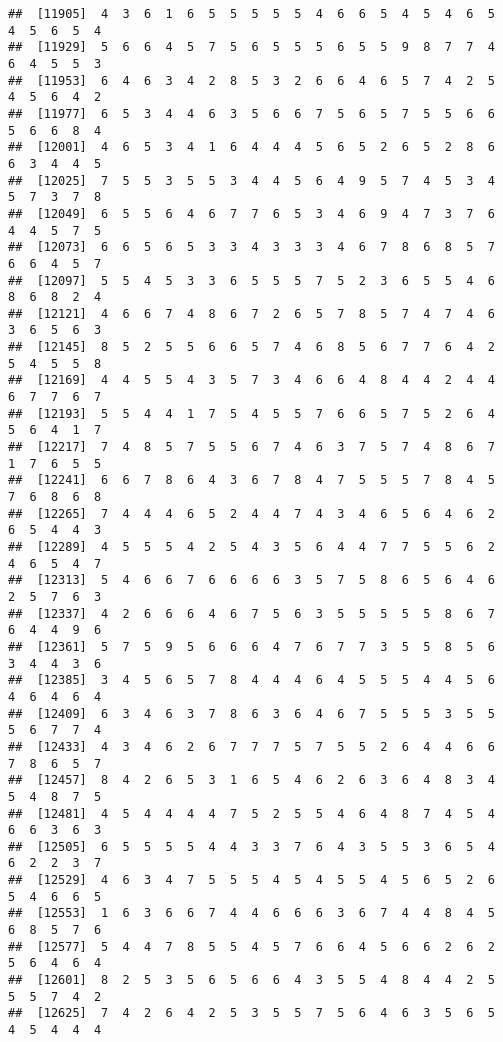 \documentclass[
]{book}
\begin{document}
\begin{verbatim}
##  [11905]  4  3  6  1  6  5  5  5  5  5  4  6  6  5  4  5  4  6  5  4  5  6  5  4
##  [11929]  5  6  6  4  5  7  5  6  5  5  5  6  5  5  9  8  7  7  4  6  4  5  5  3
##  [11953]  6  4  6  3  4  2  8  5  3  2  6  6  4  6  5  7  4  2  5  4  5  6  4  2
##  [11977]  6  5  3  4  4  6  3  5  6  6  7  5  6  5  7  5  5  6  6  5  6  6  8  4
##  [12001]  4  6  5  3  4  1  6  4  4  4  5  6  5  2  6  5  2  8  6  6  3  4  4  5
##  [12025]  7  5  5  3  5  5  3  4  4  5  6  4  9  5  7  4  5  3  4  5  7  3  7  8
##  [12049]  6  5  5  6  4  6  7  7  6  5  3  4  6  9  4  7  3  7  6  4  4  5  7  5
##  [12073]  6  6  5  6  5  3  3  4  3  3  3  4  6  7  8  6  8  5  7  6  6  4  5  7
##  [12097]  5  5  4  5  3  3  6  5  5  5  7  5  2  3  6  5  5  4  6  8  6  8  2  4
##  [12121]  4  6  6  7  4  8  6  7  2  6  5  7  8  5  7  4  7  4  6  3  6  5  6  3
##  [12145]  8  5  2  5  5  6  6  5  7  4  6  8  5  6  7  7  6  4  2  5  4  5  5  8
##  [12169]  4  4  5  5  4  3  5  7  3  4  6  6  4  8  4  4  2  4  4  6  7  7  6  7
##  [12193]  5  5  4  4  1  7  5  4  5  5  7  6  6  5  7  5  2  6  4  5  6  4  1  7
##  [12217]  7  4  8  5  7  5  5  6  7  4  6  3  7  5  7  4  8  6  7  1  7  6  5  5
##  [12241]  6  6  7  8  6  4  3  6  7  8  4  7  5  5  5  7  8  4  5  7  6  8  6  8
##  [12265]  7  4  4  4  6  5  2  4  4  7  4  3  4  6  5  6  4  6  2  6  5  4  4  3
##  [12289]  4  5  5  5  4  2  5  4  3  5  6  4  4  7  7  5  5  6  2  4  6  5  4  7
##  [12313]  5  4  6  6  7  6  6  6  6  3  5  7  5  8  6  5  6  4  6  2  5  7  6  3
##  [12337]  4  2  6  6  6  4  6  7  5  6  3  5  5  5  5  5  8  6  7  6  4  4  9  6
##  [12361]  5  7  5  9  5  6  6  6  4  7  6  7  7  3  5  5  8  5  6  3  4  4  3  6
##  [12385]  3  4  5  6  5  7  8  4  4  4  6  4  5  5  5  4  4  5  6  4  6  4  6  4
##  [12409]  6  3  4  6  3  7  8  6  3  6  4  6  7  5  5  5  3  5  5  5  6  7  7  4
##  [12433]  4  3  4  6  2  6  7  7  7  5  7  5  5  2  6  4  4  6  6  7  8  6  5  7
##  [12457]  8  4  2  6  5  3  1  6  5  4  6  2  6  3  6  4  8  3  4  5  4  8  7  5
##  [12481]  4  5  4  4  4  4  7  5  2  5  5  4  6  4  8  7  4  5  4  6  6  3  6  3
##  [12505]  6  5  5  5  5  4  4  3  3  7  6  4  3  5  5  3  6  5  4  6  2  2  3  7
##  [12529]  4  6  3  4  7  5  5  5  4  5  4  5  5  4  5  6  5  2  6  5  4  6  6  5
##  [12553]  1  6  3  6  6  7  4  4  6  6  6  3  6  7  4  4  8  4  5  6  8  5  7  6
##  [12577]  5  4  4  7  8  5  5  4  5  7  6  6  4  5  6  6  2  6  2  5  6  4  6  4
##  [12601]  8  2  5  3  5  6  5  6  6  4  3  5  5  4  8  4  4  2  5  5  5  7  4  2
##  [12625]  7  4  2  6  4  2  5  3  5  5  7  5  6  4  6  3  5  6  5  4  5  4  4  4

\end{verbatim}
\end{document}
